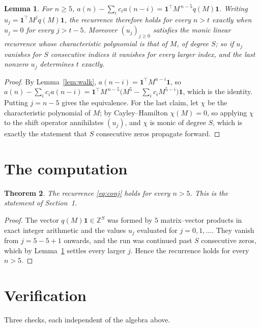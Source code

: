 \documentclass[11pt,a4paper]{article}
\theoremstyle{plain}
\newtheorem{theorem}{Theorem}
\newtheorem{lemma}[theorem]{Lemma}
\theoremstyle{definition}
\begin{document}
\begin{lemma}\label{lem:crit}
For $n\ge5$,
$a(n)-\sum_i c_i a(n-i)=\mathbf{1}^{\!\top}M^{\,n-5}q(M)\mathbf{1}$. Writing
$u_j=\mathbf{1}^{\!\top}M^{j}q(M)\mathbf{1}$, the recurrence therefore holds for every
$n>t$ exactly when $u_j=0$ for every $j>t-5$. Moreover $(u_j)_{j\ge0}$ satisfies the
monic linear recurrence whose characteristic polynomial is that of $M$, of degree $S$; so
if $u_j$ vanishes for $S$ consecutive indices it vanishes for every larger index, and the
last nonzero $u_j$ determines $t$ exactly.
\end{lemma}

\begin{proof}
By Lemma~\ref{lem:walk}, $a(n-i)=\mathbf{1}^{\!\top}M^{n-i}\mathbf{1}$, so
$a(n)-\sum_i c_i a(n-i)
=\mathbf{1}^{\!\top}M^{\,n-5}\bigl(M^{5}-\sum_i c_i M^{5-i}\bigr)
\mathbf{1}$, which is the identity. Putting $j=n-5$ gives the equivalence. For the
last claim, let $\chi$ be the characteristic polynomial of $M$; by Cayley--Hamilton
$\chi(M)=0$, so applying $\chi$ to the shift operator annihilates $(u_j)$, and $\chi$ is
monic of degree $S$, which is exactly the statement that $S$ consecutive zeros propagate
forward.
\end{proof}

\section{The computation}

\begin{theorem}
The recurrence \eqref{eq:conj} holds for every $n>5$. This is the statement of
Section~1.
\end{theorem}

\begin{proof}
The vector $q(M)\mathbf{1}\in\mathbb{Z}^{S}$ was formed by $5$ matrix--vector
products in exact integer arithmetic and the values $u_j$ evaluated for
$j=0,1,\dots$. They vanish from $j=5-5+1$ onwards, and the run was continued past
$S$ consecutive zeros, which by Lemma~\ref{lem:crit} settles every larger $j$. Hence the
recurrence holds for every $n>5$.
\end{proof}

\section{Verification}

Three checks, each independent of the algebra above.
\end{document}

